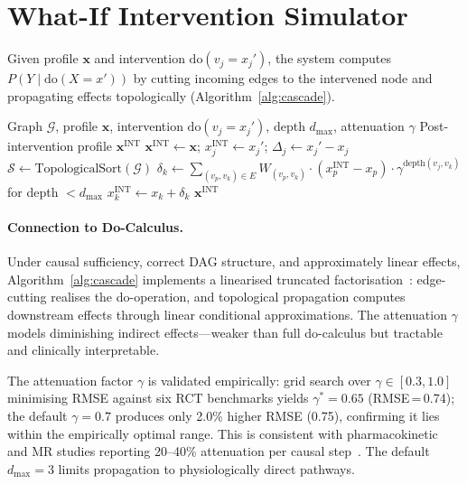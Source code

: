 \documentclass[runningheads]{llncs}
\begin{document}
\section{What-If Intervention Simulator}\label{sec:whatif}

Given profile $\mathbf{x}$ and intervention
$\mathrm{do}(v_j = x_j')$, the system computes
$P(Y \mid \mathrm{do}(X = x'))$ by cutting incoming edges to the
intervened node and propagating effects topologically
(Algorithm~\ref{alg:cascade}).

\begin{algorithm}[t]
\caption{Topological Intervention Cascade}
\label{alg:cascade}
\begin{algorithmic}[1]
\REQUIRE Graph $\mathcal{G}$, profile $\mathbf{x}$, intervention
  $\mathrm{do}(v_j = x_j')$, depth $d_{\max}$, attenuation $\gamma$
\ENSURE Post-intervention profile $\mathbf{x}^{\mathrm{INT}}$
\STATE $\mathbf{x}^{\mathrm{INT}} \leftarrow \mathbf{x}$;
  $x_j^{\mathrm{INT}} \leftarrow x_j'$;
  $\Delta_j \leftarrow x_j' - x_j$
\STATE $\mathcal{S} \leftarrow \text{TopologicalSort}(\mathcal{G})$
  \STATE $\delta_k \leftarrow \sum_{(v_p, v_k) \in E} W_{(v_p,v_k)} \cdot (x_p^{\mathrm{INT}} - x_p) \cdot \gamma^{\text{depth}(v_j,v_k)}$ for depth $< d_{\max}$
  \STATE $x_k^{\mathrm{INT}} \leftarrow x_k + \delta_k$
\ENDFOR
\RETURN $\mathbf{x}^{\mathrm{INT}}$
\end{algorithmic}
\end{algorithm}

\paragraph{Connection to Do-Calculus.}
Under causal sufficiency, correct DAG structure, and approximately
linear effects, Algorithm~\ref{alg:cascade} implements a linearised
truncated factorisation~\cite{pearl2009causality}: edge-cutting
realises the do-operation, and topological propagation computes
downstream effects through linear conditional approximations.
The attenuation $\gamma$ models diminishing indirect effects---weaker
than full do-calculus but tractable and clinically interpretable.

The attenuation factor $\gamma$ is validated empirically: grid
search over $\gamma \in [0.3, 1.0]$ minimising RMSE against six
RCT benchmarks yields $\gamma^* = 0.65$ (RMSE\,=\,0.74);
the default $\gamma = 0.7$ produces only 2.0\% higher RMSE
(0.75), confirming it lies within the empirically optimal range.
This is consistent with pharmacokinetic and MR studies reporting
20--40\% attenuation per causal
step~\cite{ctt2010,pearl2009causality}.
The default $d_{\max} = 3$ limits propagation to physiologically
direct pathways.
\end{document}
